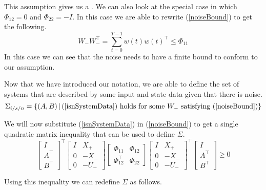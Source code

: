 This assumption gives us a .
We can also look at the special case in which $\Phi_{12} = 0$ and $\Phi_{22} = -I$. In this case we are able to rewrite (\ref{noiseBound}) to get the following.
\begin{equation} \label{noiseBoundSpecialCase}
	W_- W_-^\top = \sum^{T-1}_{t = 0}w(t)w(t)^\top \leq \Phi_{11}
\end{equation}
In this case we can see that the noise needs to have a finite bound to conform to our assumption. 

Now that we have introduced our notation, we are able to define the set of systems that are described by some input and state data given that there is noise.
\begin{equation} \label{isnSet}
\Sigma_{i/s/n} = \left\{ (A,B) \, | \, \mbox{(\ref{isnSystemData}) holds for some }W_- \mbox{ satisfying (\ref{noiseBound})} \right\}
\end{equation}

We will now substitute (\ref{isnSystemData}) in (\ref{noiseBound}) to get a single quadratic matrix inequality that can be used to define $\Sigma$.
\begin{equation} \label{noiseSystemQMI}
	\begin{bmatrix} I \\ A^\top \\ B^\top \end{bmatrix}^\top
	\begin{bmatrix} I&X_+ \\ 0 & -X_- \\ 0&-U_- \end{bmatrix}
	\begin{bmatrix} \Phi_{11} & \Phi_{12} \\ \Phi_{12}^\top & \Phi_{22} \end{bmatrix}
	\begin{bmatrix} I&X_+ \\ 0 & -X_- \\ 0&-U_- \end{bmatrix}^\top
	\begin{bmatrix} I \\ A^\top \\ B^\top \end{bmatrix} \geq 0
\end{equation}

Using this inequality we can redefine $\Sigma$ as follows.


















